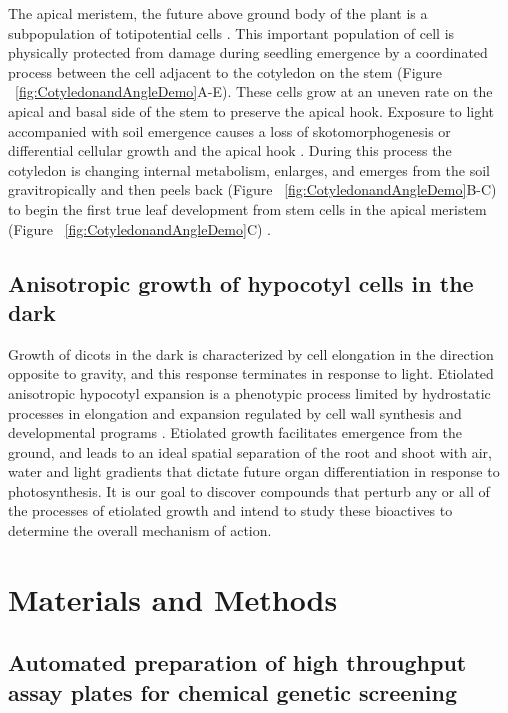 
The apical meristem, the future above ground body of the plant is a subpopulation of totipotential cells \cite{westhoff1998molecular}. This important population of cell is physically protected from damage during seedling emergence by a coordinated process between the cell adjacent to the cotyledon on the stem (Figure ~\ref{fig:CotyledonandAngleDemo}A-E). These cells grow at an uneven rate on the apical and basal side of the stem to preserve the apical hook. Exposure to light accompanied with soil emergence causes a loss of skotomorphogenesis or differential cellular growth and the apical hook \cite{guzman1990exploiting}. During this process the cotyledon is changing internal metabolism, enlarges, and emerges from the soil gravitropically and then peels back (Figure ~\ref{fig:CotyledonandAngleDemo}B-C) to begin the first true leaf development from stem cells in the apical meristem (Figure ~\ref{fig:CotyledonandAngleDemo}C) \cite{westhoff1998molecular}.

\subsection{Anisotropic growth of hypocotyl cells in the dark}

Growth of dicots in the dark is characterized by cell elongation in the direction opposite to gravity, and this response terminates in response to light. Etiolated anisotropic hypocotyl expansion is a phenotypic process limited by hydrostatic processes in elongation and expansion regulated by cell wall synthesis and developmental programs \cite{ishida2007twisted,lehman1996hookless1}. Etiolated growth facilitates emergence from the ground, and leads to an ideal spatial separation of the root and shoot with air, water and light gradients that dictate future organ differentiation in response to photosynthesis. It is our goal to discover compounds that perturb any or all of the processes of etiolated growth and intend to study these bioactives to determine the overall mechanism of action.

\section{Materials and Methods}

\subsection{Automated preparation of high throughput assay plates for chemical genetic screening}

